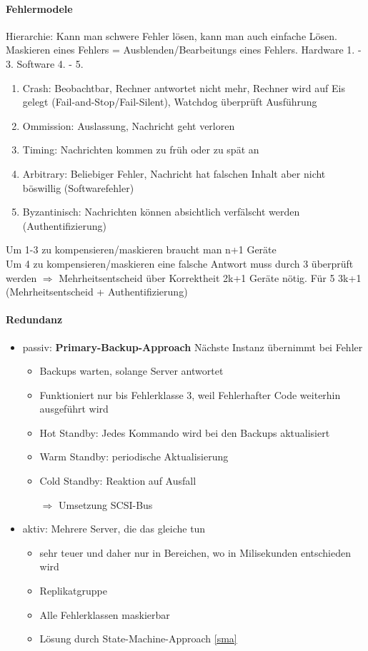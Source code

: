 \documentclass{scrartcl}
\begin{document}
\paragraph{Fehlermodele} Hierarchie: Kann man schwere Fehler lösen, kann man auch einfache Lösen. Maskieren eines Fehlers = Ausblenden/Bearbeitungs eines Fehlers. Hardware 1. - 3. Software 4. - 5.
\begin{enumerate}
\item Crash: Beobachtbar, Rechner antwortet nicht mehr, Rechner wird auf Eis gelegt (Fail-and-Stop/Fail-Silent), Watchdog überprüft Ausführung
\item Ommission: Auslassung, Nachricht geht verloren
\item Timing: Nachrichten kommen zu früh oder zu spät an
\item Arbitrary: Beliebiger Fehler, Nachricht hat falschen Inhalt aber nicht böswillig (Softwarefehler)
\item Byzantinisch: Nachrichten können absichtlich verfälscht werden (Authentifizierung)
\end{enumerate}
Um 1-3 zu kompensieren/maskieren braucht man n+1 Geräte \\
Um 4 zu kompensieren/maskieren eine falsche Antwort muss durch 3 überprüft werden $\Rightarrow$ Mehrheitsentscheid über Korrektheit 2k+1 Geräte nötig. Für 5 3k+1 (Mehrheitsentscheid + Authentifizierung)

\paragraph{Redundanz} \label{redu}
\begin{itemize}
\item passiv: \textbf{Primary-Backup-Approach} Nächste Instanz übernimmt bei Fehler
\begin{itemize}
\item Backups warten, solange Server antwortet
\item Funktioniert nur bis Fehlerklasse 3, weil Fehlerhafter Code weiterhin ausgeführt wird
\item Hot Standby: Jedes Kommando wird bei den Backups aktualisiert
\item Warm Standby: periodische Aktualisierung
\item Cold Standby: Reaktion auf Ausfall
\item[$\Rightarrow$] Umsetzung SCSI-Bus
\end{itemize}
\item aktiv: Mehrere Server, die das gleiche tun
\begin{itemize}
\item sehr teuer und daher nur in Bereichen, wo in Milisekunden entschieden wird
\item Replikatgruppe
\item Alle Fehlerklassen maskierbar
\item Lösung durch State-Machine-Approach \ref{sma}
\end{itemize}
\end{itemize}
\end{document}

